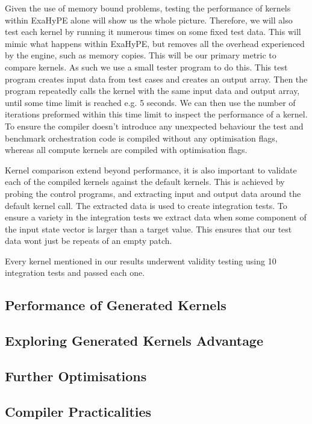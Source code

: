 Given the use of memory bound problems, testing the performance of kernels within ExaHyPE alone will show us the whole picture.
Therefore, we will also test each kernel by running it numerous times on some fixed test data.
This will mimic what happens within ExaHyPE, but removes all the overhead experienced by the engine, such as memory copies.
This will be our primary metric to compare kernels.
As such we use a small tester program to do this.
This test program creates input data from test cases and creates an output array.
Then the program repeatedly calls the kernel with the same input data and output array, until some time limit is reached e.g. 5 seconds.
We can then use the number of iterations preformed within this time limit to inspect the performance of a kernel.
To ensure the compiler doesn't introduce any unexpected behaviour the test and benchmark orchestration code is compiled without any optimisation flags, whereas all compute kernels are compiled with optimisation flags.

Kernel comparison extend beyond performance, it is also important to validate each of the compiled kernels against the default kernels.
This is achieved by probing the control programs, and extracting input and output data around the default kernel call.
The extracted data is used to create integration tests.
To ensure a variety in the integration tests we extract data when some component of the input state vector is larger than a target value. 
This ensures that our test data wont just be repeats of an empty patch.

Every kernel mentioned in our results underwent validity testing using 10 integration tests and passed each one.

\subsection{Performance of Generated Kernels}

\subsection{Exploring Generated Kernels Advantage}

\subsection{Further Optimisations}

\subsection{Compiler Practicalities} \label{sec:practical}
